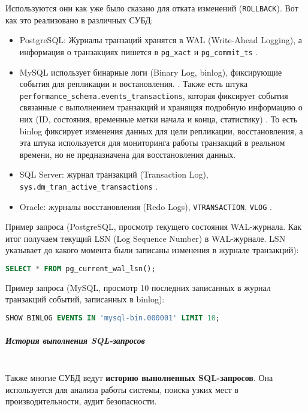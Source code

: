 Используются они как уже было сказано для отката изменений (\texttt{ROLLBACK}).
Вот как это реализовано в различных СУБД:

\begin{itemize}
    \item PostgreSQL: Журналы транзаций хранятся в WAL (Write-Ahead Logging), а информация о транзакциях пишется в \texttt{pg\_xact} и \texttt{pg\_commit\_ts} \autocite{PostgreSQLdocc28}.
    \item MySQL использует бинарные логи (Binary Log, binlog), фиксирующие события для репликации и востановления. \autocite{Mysqldoc3}. Также есть штука \texttt{performance\_schema.events\_transactions}, которая фиксирует события связанные с выполнением транзакций и хранящяя подробную информацию о них (ID, состояния, временные метки начала и конца, статистику) \autocite{Mysqldoc2}. То есть binlog фиксирует изменения данных для цели репликации, восстановления, а эта штука используется для мониторинга работы транзакций в реальном времени, но не предназначена для восстановления данных. 
    \item SQL Server: журнал транзакций (Transaction Log), \texttt{sys.dm\_tran\_active\_transactions} \autocite{MicrosoftLearnSQLserverTransLog}.
    \item Oracle: журналы восстановления (Redo Logs), \texttt{V\textdollar TRANSACTION}, \texttt{V\textdollar LOG} \autocite{OracleRedoLog}.
\end{itemize}

Пример запроса (PostgreSQL, просмотр текущего состояния WAL-журнала. Как итог получаем текущий LSN (Log Sequence Number) в WAL-журнале. LSN указывает до какого момента были записаны изменения в журнале транзакций):
\begin{lstlisting}[language=SQL]
    SELECT * FROM pg_current_wal_lsn();                
\end{lstlisting}

Пример запроса (MySQL, просмотр 10 последних записанных в журнал транзакций событий, записанных в binlog):
\begin{lstlisting}[language=SQL]
    SHOW BINLOG EVENTS IN 'mysql-bin.000001' LIMIT 10;           
\end{lstlisting}

\subparagraph{История выполнения SQL-запросов} ~\\

Также многие СУБД ведут \textbf{историю выполненных SQL-запросов}. Она используется для анализа работы системы, поиска узких мест в производительности, аудит безопасности. 

